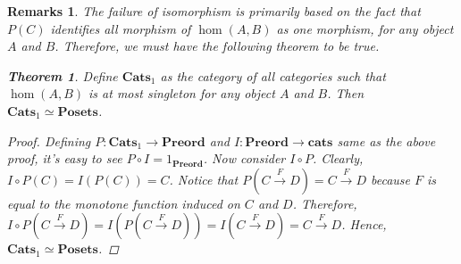 \documentclass[a4paper, 11pt]{book}
\theoremstyle{plain}
\newtheorem*{remarks}{Remarks}
\newtheorem*{theorem}{Theorem}
\theoremstyle{plain}
\newcommand{\mb}{\mathbf}
\newcommand{\arr}{\rightarrow}
\newcommand{\warr}{\xrightarrow}
\begin{document}
  \begin{remarks}
    The failure of isomorphism is primarily based on the fact that $P(C)$ identifies all morphism of $\hom(A,B)$ as one morphism, for any object $A$ and $B$. Therefore, we must have the following theorem to be true. 
    \begin{theorem}
      Define $\mb{Cats}_1$ as the category of all categories such that $\hom(A,B)$ is at most singleton for any object $A$ and $B$. Then $\mb{Cats}_1 \simeq \mb{Posets}$.
    \end{theorem}
    \begin{proof}
      Defining $P: \mb{Cats}_1 \arr \mb{Preord}$ and $I: \mb{Preord} \arr \mb{cats}$ same as the above proof, it's easy to see $P \circ I=1_{\mb{Preord}}$. Now consider $I \circ P$. Clearly, $I \circ P(C)=I(P(C))=C$. Notice that $P(C \warr{F} D)=C \warr{F} D$ because $F$ is equal to the monotone function induced on $C$ and $D$. Therefore, $I \circ P( C \warr{F} D)=I(P( C \warr{F} D) )=I(C \warr{F} D)=C \warr{F} D$. Hence, $\mb{Cats}_1 \simeq \mb{Posets}$.
    \end{proof}
  \end{remarks}
\end{document}
